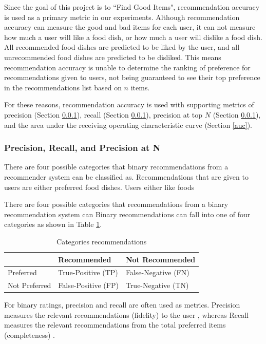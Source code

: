 Since the goal of this project is to ``Find Good Items", recommendation accuracy is used as a primary metric in our experiments. Although recommendation accuracy can measure the good and bad items for each user, it can not measure how much a user will like a food dish, or how much a user will dislike a food dish. All recommended food dishes are predicted to be liked by the user, and all unrecommended food dishes are predicted to be disliked. This means recommendation accuracy is unable to determine the ranking of preference for recommendations given to users, not being guaranteed to see their top preference in the recommendations list based on $n$ items. 

For these reasons, recommendation accuracy is used with supporting metrics of precision (Section \ref{precision}), recall (Section \ref{precision}), precision at top $N$ (Section \ref{precision}), and the area under the receiving operating characteristic curve (Section \ref{auc}). 

\subsubsection{Precision, Recall, and Precision at N} \label{precision}

There are four possible categories that binary recommendations from a recommender system can be classified as. Recommendations that are given to users are either preferred food dishes. Users either like foods 

There are four possible categories that recommendations from a binary recommendation system can 
Binary recommendations can fall into one of four categories as shown in Table \ref{table:categories}.


\begin{table}[h!]
\centering
\begin{tabular}{|l|l|l|} 
     \hline
      & Recommended & Not Recommended \\ [0.5ex] 
     \hline
     Preferred & True-Positive (TP) & False-Negative (FN)\\
     \hline
     Not Preferred & False-Positive (FP) & True-Negative (TN) \\
     \hline
\end{tabular}
\caption{Categories recommendations}
\label{table:categories}
\end{table}

For binary ratings, precision and recall are often used as metrics. Precision measures the relevant recommendations (fidelity) to the user , whereas Recall measures the relevant recommendations from the total preferred items (completeness) . 

